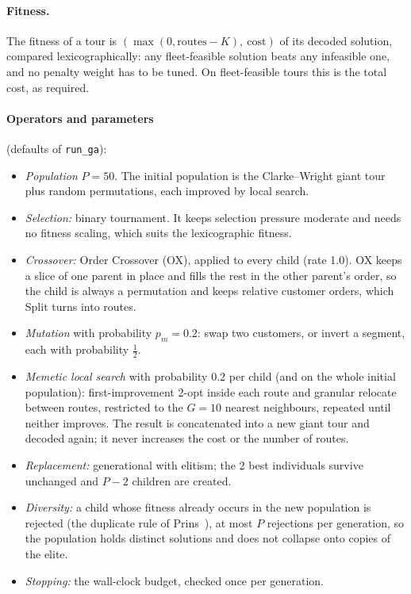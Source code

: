 \documentclass[11pt,a4paper]{article}
\theoremstyle{definition}
\theoremstyle{remark}
\newcommand{\code}[1]{\texttt{#1}}
\begin{document}
\paragraph{Fitness.} The fitness of a tour is
$(\max(0,\text{routes}-K),\ \text{cost})$ of its decoded solution, compared
lexicographically: any fleet-feasible solution beats any infeasible one, and no penalty
weight has to be tuned. On fleet-feasible tours this is the total cost, as required.

\paragraph{Operators and parameters} (defaults of \code{run\_ga}):
\begin{itemize}
\item \emph{Population} $P=50$. The initial population is the Clarke--Wright giant tour plus
  random permutations, each improved by local search.
\item \emph{Selection:} binary tournament. It keeps selection pressure moderate and needs no
  fitness scaling, which suits the lexicographic fitness.
\item \emph{Crossover:} Order Crossover (OX), applied to every child (rate 1.0). OX keeps a
  slice of one parent in place and fills the rest in the other parent's order, so the child
  is always a permutation and keeps relative customer orders, which Split turns into routes.
\item \emph{Mutation} with probability $p_m=0.2$: swap two customers, or invert a segment,
  each with probability $\tfrac12$.
\item \emph{Memetic local search} with probability $0.2$ per child (and on the whole initial
  population): first-improvement 2-opt inside each route and granular relocate between
  routes, restricted to the $G=10$ nearest neighbours, repeated until neither improves. The
  result is concatenated into a new giant tour and decoded again; it never increases the
  cost or the number of routes.
\item \emph{Replacement:} generational with elitism; the 2 best individuals survive
  unchanged and $P-2$ children are created.
\item \emph{Diversity:} a child whose fitness already occurs in the new population is
  rejected (the duplicate rule of Prins~\cite{prins2004}), at most $P$ rejections per
  generation, so the population holds distinct solutions and does not collapse onto copies
  of the elite.
\item \emph{Stopping:} the wall-clock budget, checked once per generation.
\end{itemize}
\end{document}
